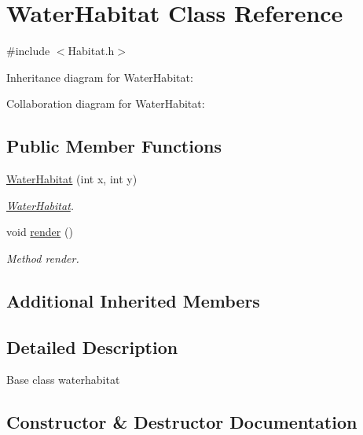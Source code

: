 \hypertarget{classWaterHabitat}{}\section{Water\+Habitat Class Reference}
\label{classWaterHabitat}


{\ttfamily \#include $<$Habitat.\+h$>$}



Inheritance diagram for Water\+Habitat\+:


Collaboration diagram for Water\+Habitat\+:
\subsection*{Public Member Functions}
\begin{DoxyCompactItemize}
\item 
\hyperlink{classWaterHabitat_a983ed93066b800c49d952aef0ad090a9}{Water\+Habitat} (int x, int y)
\begin{DoxyCompactList}\small\item\em \hyperlink{classWaterHabitat}{Water\+Habitat}. \end{DoxyCompactList}\item 
void \hyperlink{classWaterHabitat_a0820a384777ce7ba41244494e76eae13}{render} ()\hypertarget{classWaterHabitat_a0820a384777ce7ba41244494e76eae13}{}\label{classWaterHabitat_a0820a384777ce7ba41244494e76eae13}

\begin{DoxyCompactList}\small\item\em Method render. \end{DoxyCompactList}\end{DoxyCompactItemize}
\subsection*{Additional Inherited Members}


\subsection{Detailed Description}
Base class waterhabitat 

\subsection{Constructor \& Destructor Documentation}
